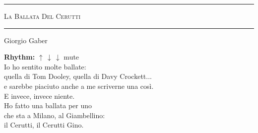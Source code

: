 \documentclass[10pt, twoside, a4paper]{article}
\begin{document}
\begin{center}

	\hrule \vspace{0.2cm}
     	\textsc{\LARGE La Ballata Del Cerutti}
	\vspace{0.2cm} \hrule \vspace{0.2cm}
      	{\large Giorgio Gaber}
      	
\end{center}

		
\textbf{Rhythm:} $\uparrow \,\downarrow \,\downarrow$ mute \\

Io ho sentito molte ballate:\\
quella di Tom Dooley, quella di Davy Crockett...\\
e sarebbe piaciuto anche a me scriverne una cos\`i.\\
E invece, invece niente.\\
Ho fatto una ballata per uno\\
che sta a Milano, al Giambellino:\\
il Cerutti, il Cerutti Gino.\\
\end{document}
